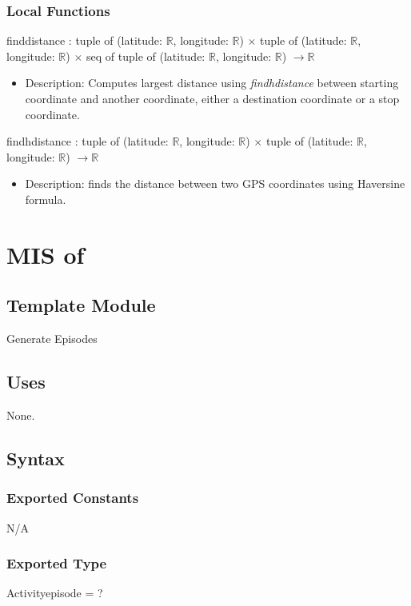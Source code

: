 \documentclass[12pt, titlepage]{article}
\begin{document}
\subsubsection{Local Functions}

finddistance : tuple of (latitude: $\mathbb{R}$, longitude: $\mathbb{R}$) $\times$ tuple of (latitude: $\mathbb{R}$, longitude: $\mathbb{R}$) $\times$ seq of tuple of (latitude: $\mathbb{R}$, longitude: $\mathbb{R}$) $\rightarrow \mathbb{R}$
\begin{itemize}
    \item Description: Computes largest distance using \emph{findhdistance} between starting coordinate and another coordinate, either a destination coordinate or a stop coordinate.
\end{itemize}
findhdistance : tuple of (latitude: $\mathbb{R}$, longitude: $\mathbb{R}$) $\times$ tuple of (latitude: $\mathbb{R}$, longitude: $\mathbb{R}$) $\rightarrow \mathbb{R}$
\begin{itemize}
    \item Description: finds the distance between two GPS coordinates using Haversine formula. 
\end{itemize}


\newpage



\section{MIS of } \label{Module} 

\subsection{Template Module}
Generate Episodes

\subsection{Uses}
None.

\subsection{Syntax}

\subsubsection{Exported Constants}
N/A

\subsubsection{Exported Type}
Activityepisode = ?
\end{document}
